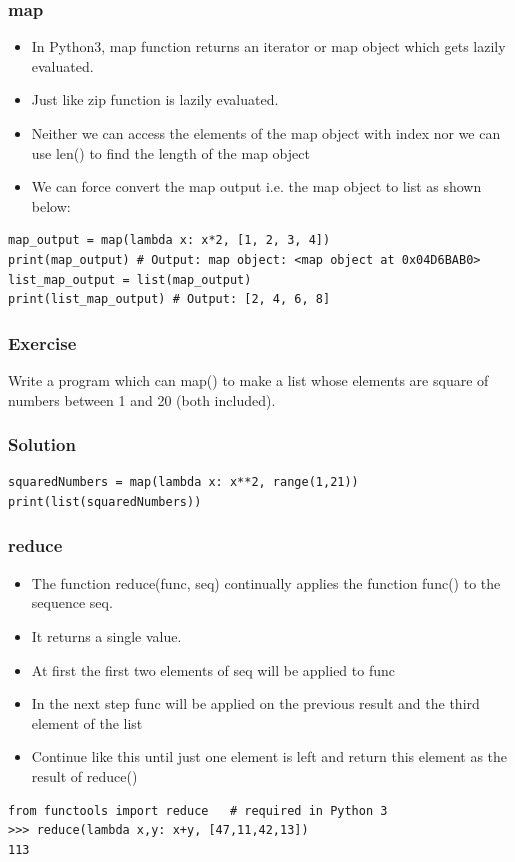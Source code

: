 \begin{frame}[fragile]\frametitle{map}
    \begin{itemize}
    \item  In Python3, map function returns an iterator or map object which gets lazily evaluated. 
    \item Just like zip function is lazily evaluated.
    \item Neither we can access the elements of the map object with index nor we can use len() to find the length of the map object
\item We can force convert the map output i.e. the map object to list as shown below:
    \end{itemize}
    	    \begin{lstlisting}
map_output = map(lambda x: x*2, [1, 2, 3, 4])
print(map_output) # Output: map object: <map object at 0x04D6BAB0>
list_map_output = list(map_output)
print(list_map_output) # Output: [2, 4, 6, 8]
\end{lstlisting}
\end{frame}

\begin{frame}[fragile]\frametitle{Exercise}
Write a program which can map() to make a list whose elements are square of numbers between 1 and 20 (both included).



\end{frame}

\begin{frame}[fragile]\frametitle{Solution}
\begin{lstlisting}
squaredNumbers = map(lambda x: x**2, range(1,21))
print(list(squaredNumbers))
\end{lstlisting}
\end{frame}


\begin{frame}[fragile]\frametitle{reduce}
    \begin{itemize}
    \item  The function reduce(func, seq) continually applies the function func() to the sequence seq.
    \item It returns a single value. 
    \item At first the first two elements of seq will be applied to func
    \item In the next step func will be applied on the previous result and the third element of the list
    \item Continue like this until just one element is left and return this element as the result of reduce()
    \end{itemize}
    	    \begin{lstlisting}
from functools import reduce   # required in Python 3
>>> reduce(lambda x,y: x+y, [47,11,42,13])
113
\end{lstlisting}
\end{frame}


